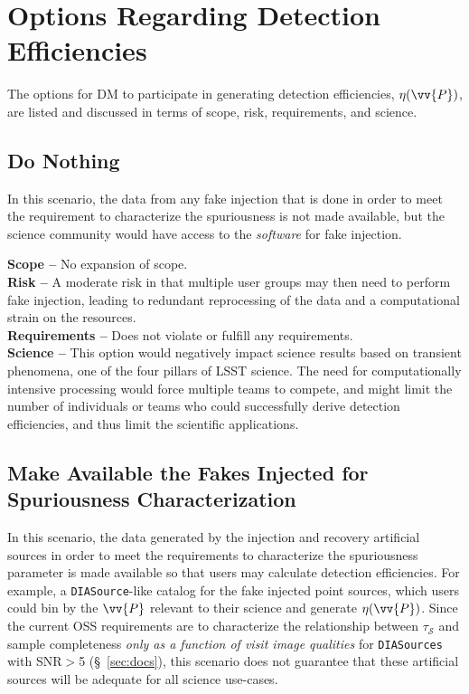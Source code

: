 \section{Options Regarding Detection Efficiencies} \label{sec:opts}

The options for DM to participate in generating detection efficiencies, $\eta(\vv{P})$, are listed and discussed in terms of scope, risk, requirements, and science. 

\subsection{Do Nothing}\label{ssec:opts_no}

In this scenario, the data from any fake injection that is done in order to meet the requirement to characterize the spuriousness is not made available, but the science community would have access to the {\it software} for fake injection.

{\bf Scope --} No expansion of scope. \\
{\bf Risk --} A moderate risk in that multiple user groups may then need to perform fake injection, leading to redundant reprocessing of the data and a computational strain on the resources. \\
{\bf Requirements --} Does not violate or fulfill any requirements. \\
{\bf Science --} This option would negatively impact science results based on transient phenomena, one of the four pillars of LSST science. The need for computationally intensive processing would force multiple teams to compete, and might limit the number of individuals or teams who could successfully derive detection efficiencies, and thus limit the scientific applications.

\subsection{Make Available the Fakes Injected for Spuriousness Characterization}\label{ssec:opts_makefakeavail}

In this scenario, the data generated by the injection and recovery artificial sources in order to meet the requirements to characterize the spuriousness parameter is made available so that users may calculate detection efficiencies. For example, a {\tt DIASource}-like catalog for the fake injected point sources, which users could bin by the $\vv{P}$ relevant to their science and generate $\eta(\vv{P})$. Since the current OSS requirements are to characterize the relationship between $\tau_{\mathcal{S}}$ and sample completeness {\it only as a function of visit image qualities} for {\tt DIASources} with SNR$>$5 (\S~\ref{sec:docs}), this scenario does not guarantee that these artificial sources will be adequate for all science use-cases. 

